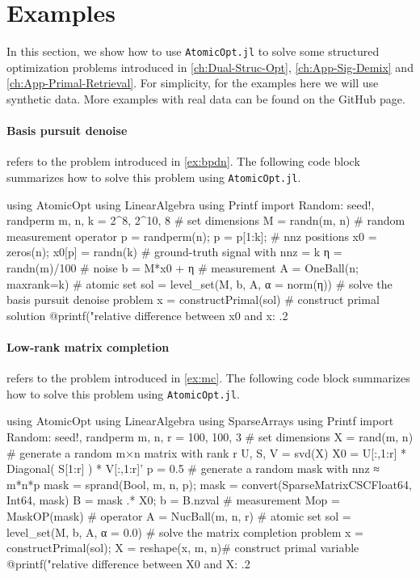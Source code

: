 \section{Examples} \label{sec:5-4}

In this section, we show how to use \texttt{AtomicOpt.jl} to solve some structured optimization problems introduced in \autoref{ch:Dual-Struc-Opt}, \autoref{ch:App-Sig-Demix} and \autoref{ch:App-Primal-Retrieval}. For simplicity, for the examples here we will use synthetic data. More examples with real data can be found on the GitHub page. 

\paragraph{Basis pursuit denoise} refers to the problem introduced in \autoref{ex:bpdn}. The following code block summarizes how to solve this problem using \texttt{AtomicOpt.jl}.
\begin{code}
  using AtomicOpt
  using LinearAlgebra
  using Printf
  import Random: seed!, randperm
  m, n, k = 2^8, 2^10, 8                  # set dimensions
  M = randn(m, n)                         # random measurement operator
  p = randperm(n); p = p[1:k];            # nnz positions
  x0 = zeros(n); x0[p] = randn(k)         # ground-truth signal with nnz = k
  η = randn(m)/100                        # noise
  b = M*x0 + η                            # measurement
  A = OneBall(n; maxrank=k)               # atomic set
  sol = level_set(M, b, A, α = norm(η))   # solve the basis pursuit denoise problem
  x = constructPrimal(sol)                # construct primal solution
  @printf("relative difference between x0 and x: .2%
\end{code}

\paragraph{Low-rank matrix completion} refers to the problem introduced in \autoref{ex:mc}. The following code block summarizes how to solve this problem using \texttt{AtomicOpt.jl}.
\begin{code}
  using AtomicOpt
  using LinearAlgebra
  using SparseArrays
  using Printf
  import Random: seed!, randperm
  m, n, r = 100, 100, 3                         # set dimensions
  X = rand(m, n)                                # generate a random m×n matrix with rank r
  U, S, V = svd(X)
  X0 = U[:,1:r] * Diagonal( S[1:r] ) * V[:,1:r]'  
  p = 0.5                                       # generate a random mask with nnz ≈ m*n*p
  mask = sprand(Bool, m, n, p); 
  mask = convert(SparseMatrixCSC{Float64, Int64}, mask) 
  B =  mask .* X0; b =  B.nzval                 # measurement
  Mop = MaskOP(mask)                            # operator
  A = NucBall(m, n, r)                          # atomic set
  sol = level_set(M, b, A, α = 0.0)             # solve the matrix completion problem
  x = constructPrimal(sol); X = reshape(x, m, n)# construct primal variable
  @printf("relative difference between X0 and X: .2%
\end{code}


